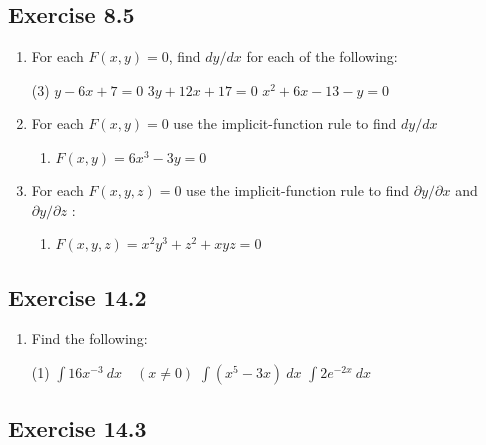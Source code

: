 \documentclass{./../../Latex/homework}
\begin{document}
\thispagestyle{plain}

\subsection*{Exercise 8.5}

\begin{enumerate}

\item[1.] For each $F(x, y) = 0$, find $d y / d x$ for each of the following:
\begin{tasks}(3)
\task $y-6 x+7 = 0$
\task $3 y+12 x+17=0$
\task $x^{2}+6 x-13-y=0$
\end{tasks}

\item[2.] For each $F(x, y)=0$ use the implicit-function rule to find $d y / d x$ 
\begin{enumerate}
\item[(d)] $F(x, y)=6 x^{3}-3 y=0$
\end{enumerate}

\item[3.] For each $F(x, y, z)=0$ use the implicit-function rule to find $\partial y / \partial x$ and $\partial y / \partial z$ :
\begin{enumerate}
\item[(a)] $F(x, y, z)=x^{2} y^{3}+z^{2}+x y z=0$
\end{enumerate}

\end{enumerate}

\subsection*{Exercise 14.2}

\begin{enumerate}	
\item[1.] Find the following: 
\begin{tasks}(1)
\task[(a)] $ \displaystyle\int 16x^{-3} \ dx \quad (x \neq 0) $
\task[(c)] $ \displaystyle\int (x^5-3x) \ dx $
\task[(d)] $ \displaystyle\int 2e^{-2x} \ dx $
\end{tasks}
\end{enumerate}

\subsection*{Exercise 14.3}
\end{document}

